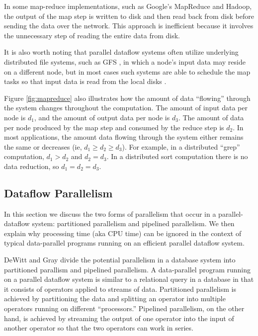 \documentclass{acm_proc_article-sp}
\begin{document}
In some map-reduce implementations, such as Google's MapReduce and Hadoop, the output of the map step is written to disk and then read back from disk before sending the data over the network. This approach is inefficient because it involves the unnecessary step of reading the entire data from disk.

It is also worth noting that parallel dataflow systems often utilize underlying distributed file systems, such as GFS \cite{gfs}, in which a node's input data may reside on a different node, but in most cases such systems are able to schedule the map tasks so that input data is read from the local disks \cite{mapreduce}.

Figure \ref{fig:mapreduce} also illustrates how the amount of data ``flowing'' through the system changes throughout the computation. The amount of input data per node is $d_1$, and the amount of output data per node is $d_3$. The amount of data per node produced by the map step and consumed by the reduce step is $d_2$. In most applications, the amount data flowing through the system either remains the same or decreases (ie, $d_1 \ge d_2 \ge d_3$). For example, in a distributed ``grep'' computation, $d_1 > d_2$ and $d_2 = d_3$. In a distributed sort computation there is no data reduction, so $d_1 = d_2 = d_3$.

\subsection{Dataflow Parallelism}

In this section we discuss the two forms of parallelism that occur in a parallel-dataflow system: partitioned parallelism and pipelined parallelism. We then explain why processing time (aka CPU time) can be ignored in the context of typical data-parallel programs running on an efficient parallel dataflow system.

DeWitt and Gray \cite{paralleldatabases} divide the potential parallelism in a database system into partitioned parallism and pipelined parallelism. A data-parallel program running on a parallel dataflow system is similar to a relational query in a database in that it consists of operators applied to streams of data. Partitioned parallelism is achieved by partitioning the data and splitting an operator into multiple operators running on different ``processors.'' Pipelined parallelism, on the other hand, is achieved by streaming the output of one operator into the input of another operator so that the two operators can work in series.
\end{document}
